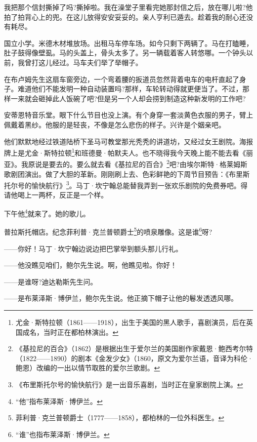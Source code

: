 \par 我把那个信封撕掉了吗?撕掉啦。我在澡堂子里看完她那封信之后，放在哪儿啦?他拍了拍背心上的兜。在这儿放得安安妥妥的。亲人亨利已遁去。趁着我的耐心还没有耗尽。
\par 国立小学。米德木材堆放场。出租马车停车场。如今只剩下两辆了。马在打瞌睡，肚子鼓得像壁虱。马的头盖上，骨头太多了。另一辆载着客人转悠哪。一个钟头以前，我曾打这儿经过。马车夫们举了举帽子。
\par 在布卢姆先生这扇车窗旁边，一个弯着腰的扳道员忽然背着电车的电杆直起了身子。难道他们不能发明一种自动装置吗?那样，车轮转动得就更便当了。不过，那样一来就会砸掉此人饭碗了吧?但是另一个人却会捞到制造这种新发明的工作吧?
\par 安蒂恩特音乐堂。眼下什么节目也没上演。有个身穿一套淡黄色衣服的男子，臂上佩戴着黑纱。他服的是轻丧，不像是怎么悲伤的样子。兴许是个姻亲吧。
\par 他们默默地经过铁道陆桥下圣马可教堂那光秃秃的讲道坊，又经过女王剧院。海报牌上是尤金·斯特拉顿\footnote{尤金·斯特拉顿（1861——1918），出生于美国的黑人歌手，喜剧演员，后在英国成名，当时正在都柏林演出。}和班德曼·帕默夫人。也不晓得我今天晚上能不能去看《丽亚》。我原说是要去的。要么就去看《基拉尼的百合》\footnote{《基拉尼的百合》（1862）是根据出生于爱尔兰的美国剧作家戴恩·鲍西考尔特（1822——1890）的剧本《金发少女》（1860，原文为爱尔兰语，音译为科伦·鲍恩）改编的一出以情节取胜的爱尔兰歌剧。}吧?由埃尔斯特·格莱姆斯歌剧团演出。做了大胆的革新。刚刚刷上去、色彩鲜艳的下周节目预告：《布里斯托尔号的愉快航行》\footnote{《布里斯托尔号的愉快航行》是一出音乐喜剧，当时正在皇家剧院上演。}。马丁·坎宁翰总能替我弄到一张欢乐剧院的免费券吧。得请他喝上一两杯，反正是一个样。
\par 下午他\footnote{“他”指布莱泽斯·博伊兰。}就来了。她的歌儿。
\par 普拉斯托帽店。纪念菲利普·克兰普顿爵士\footnote{菲利普·克兰普顿爵士（1777——1858），都柏林的一位外科医生。}的喷泉雕像。这是谁\footnote{“谁”也指布莱泽斯·博伊兰。}呀?
\par ——你好！马丁·坎宁翰边说边把巴掌举到额头那儿行礼。
\par ——他没瞧见咱们，鲍尔先生说。啊，他瞧见啦。你好！
\par ——是谁呀?迪达勒斯先生问。
\par ——是布莱泽斯·博伊兰，鲍尔先生说。他正摘下帽子让他的鬈发透透风哪。
